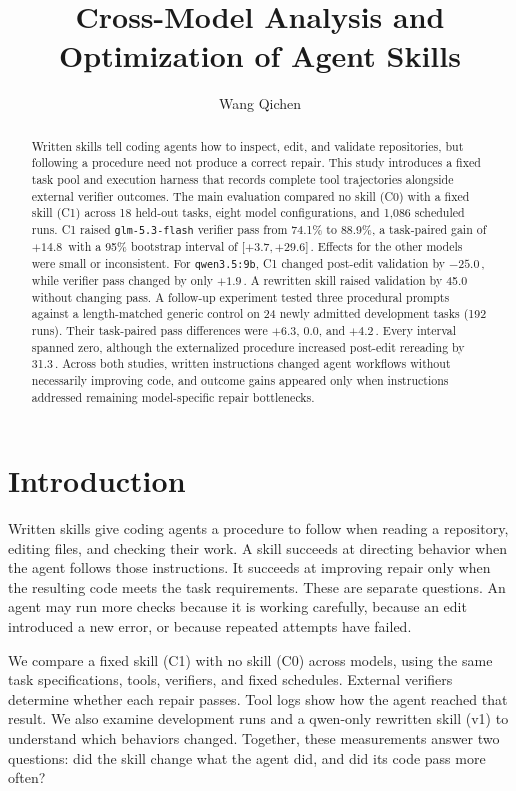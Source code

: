 \documentclass[10pt]{article}
\title{Cross-Model Analysis and Optimization of Agent Skills}
\author{Wang Qichen}
\date{}
\newcommand{\pp}{\,\text{pp}}
\newcommand{\QwenWeak}{\texttt{qwen3.5:\allowbreak 9b}}
\newcommand{\GLM}{\texttt{glm-5.3-flash}}
\begin{document}
\raggedbottom
\maketitle

\begin{abstract}
Written skills tell coding agents how to inspect, edit, and validate repositories, but following a procedure need not produce a correct repair. This study introduces a fixed task pool and execution harness that records complete tool trajectories alongside external verifier outcomes. The main evaluation compared no skill (C0) with a fixed skill (C1) across 18 held-out tasks, eight model configurations, and 1,086 scheduled runs. C1 raised \GLM{} verifier pass from 74.1\% to 88.9\%, a task-paired gain of \(+14.8\)\pp{} with a 95\% bootstrap interval of \(\lbrack +3.7,+29.6\rbrack\)\pp{}. Effects for the other models were small or inconsistent. For \QwenWeak{}, C1 changed post-edit validation by \(-25.0\)\pp{}, while verifier pass changed by only \(+1.9\)\pp{}. A rewritten skill raised validation by 45.0\pp{} without changing pass. A follow-up experiment tested three procedural prompts against a length-matched generic control on 24 newly admitted development tasks (192 runs). Their task-paired pass differences were \(+6.3\), 0.0, and \(+4.2\)\pp{}. Every interval spanned zero, although the externalized procedure increased post-edit rereading by 31.3\pp{}. Across both studies, written instructions changed agent workflows without necessarily improving code, and outcome gains appeared only when instructions addressed remaining model-specific repair bottlenecks.
\end{abstract}

\section{Introduction}
Written skills give coding agents a procedure to follow when reading a repository, editing files, and checking their work. A skill succeeds at directing behavior when the agent follows those instructions. It succeeds at improving repair only when the resulting code meets the task requirements. These are separate questions. An agent may run more checks because it is working carefully, because an edit introduced a new error, or because repeated attempts have failed.

We compare a fixed skill (C1) with no skill (C0) across models, using the same task specifications, tools, verifiers, and fixed schedules. External verifiers determine whether each repair passes. Tool logs show how the agent reached that result. We also examine development runs and a qwen-only rewritten skill (v1) to understand which behaviors changed. Together, these measurements answer two questions: did the skill change what the agent did, and did its code pass more often?
\end{document}
